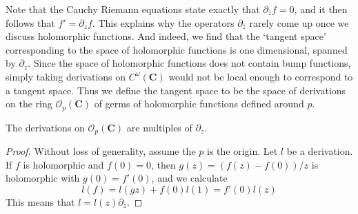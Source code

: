 Note that the Cauchy Riemann equations state exactly that $\partial_{\overline{z}} f = 0$, and it then follows that $f' = \partial_z f$. This explains why the operators $\partial_{\overline{z}}$ rarely come up once we discuss holomorphic functions. And indeed, we find that the `tangent space' corresponding to the space of holomorphic functions is one dimensional, spanned by $\partial_z$. Since the space of holomorphic functions does not contain bump functions, simply taking derivations on $C^\omega(\mathbf{C})$ would not be local enough to correspond to a tangent space. Thus we define the tangent space to be the space of derivations on the ring $\mathcal{O}_p(\mathbf{C})$ of germs of holomorphic functions defined around $p$.

\begin{theorem}
    The derivations on $\mathcal{O}_p(\mathbf{C})$ are multiples of $\partial_z$.
\end{theorem}
\begin{proof}
    Without loss of generality, assume the $p$ is the origin. Let $l$ be a derivation. If $f$ is holomorphic and $f(0) = 0$, then $g(z) = (f(z) - f(0))/z$ is holomorphic with $g(0) = f'(0)$, and we calculate
    \[ l(f) = l(gz) + f(0)l(1) = f'(0)l(z) \]
    This means that $l = l(z) \partial_z$.
\end{proof}


